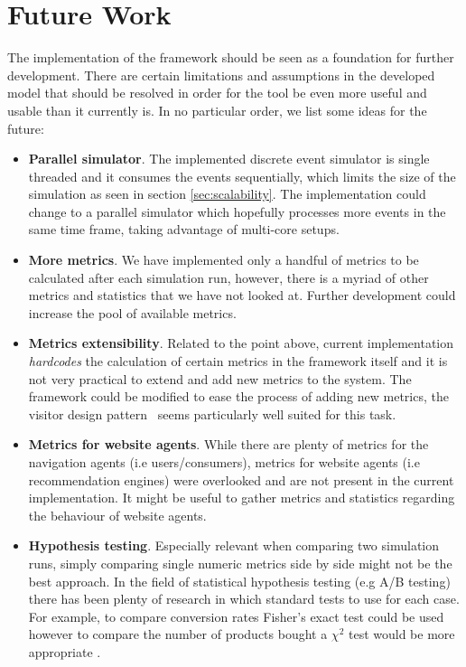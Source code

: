\section{Future Work}

The implementation of the framework should be seen as a foundation for further 
development. There are certain limitations and assumptions in the developed 
model that should be resolved in order for the tool be even more useful and 
usable than it currently is. In no particular order, we list some ideas for the 
future:

\begin{itemize}
    \item \textbf{Parallel simulator}. The implemented discrete event simulator 
    is single threaded and it consumes the events sequentially, which limits 
    the size of the simulation as seen in section \ref{sec:scalability}. The 
    implementation could change to a parallel simulator which hopefully 
    processes more events in the same time frame, taking advantage of 
    multi-core setups.
    
    \item \textbf{More metrics}. We have implemented only a handful of metrics 
    to be calculated after each simulation run, however, there is a myriad of 
    other metrics and statistics that we have not looked at. Further 
    development could increase the pool of available metrics.
    
    \item \textbf{Metrics extensibility}. Related to the point above, current 
    implementation \textit{hardcodes} the calculation of certain metrics in the 
    framework itself and it is not very practical to extend and add new metrics 
    to the system. The framework could be modified to ease the process of 
    adding new metrics, the visitor design pattern~\cite{gamma1995design} seems 
    particularly well suited for this task.
    
    \item \textbf{Metrics for website agents}. While there are plenty of 
    metrics for the navigation agents (i.e users/consumers), metrics for 
    website agents (i.e recommendation engines) were overlooked and are not 
    present in the current implementation. It might be useful to gather metrics 
    and statistics regarding the behaviour of website agents.
    
    \item \textbf{Hypothesis testing}. Especially relevant when comparing two 
    simulation runs, simply comparing single numeric metrics side by side might 
    not be the best approach. In the field of statistical hypothesis testing 
    (e.g A/B testing) there has been plenty of research in which standard tests 
    to use for each case. For example, to compare conversion rates Fisher's 
    exact test could be used however to compare the number of products bought a 
    $\chi^2$ test would be more appropriate \cite{wikiab}.
    

\end{itemize}
